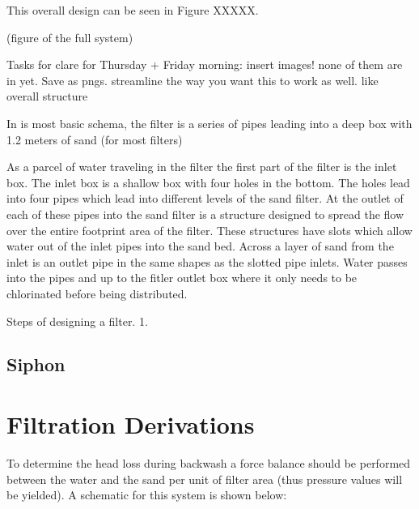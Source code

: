 \documentclass[letterpaper,10pt,english]{sphinxmanual}
\begin{document}
{This overall design can be seen in Figure XXXXX.

(figure of the full system)

Tasks for clare for Thursday + Friday morning: insert images! none of them are in yet. Save as pngs. streamline the way you want this to work as well. like overall structure

In is most basic schema, the filter is a series of pipes leading into a deep box with 1.2 meters of sand (for most filters)

As a parcel of water traveling in the filter the first part of the filter is the inlet box. The inlet box is a shallow box with four holes in the bottom. The holes lead into four pipes which lead into different levels of the sand filter. At the outlet of each of these pipes into the sand filter is a structure designed to spread the flow over the entire footprint area of the filter. These structures have slots which allow water out of the inlet pipes into the sand bed. Across a layer of sand from the inlet is an outlet pipe in the same shapes as the slotted pipe inlets. Water passes into the pipes and up to the fitler outlet box where it only needs to be chlorinated before being distributed.

Steps of designing a filter.
1.


\section{Siphon}
\label{\detokenize{Filtration/Filtration_Design:siphon}}\label{\detokenize{Filtration/Filtration_Design:id1}}

\chapter{Filtration Derivations}
\label{\detokenize{Filtration/Filtration_Derivations:filtration-derivations}}\label{\detokenize{Filtration/Filtration_Derivations:title-filtration-derivations}}\label{\detokenize{Filtration/Filtration_Derivations::doc}}\label{\detokenize{Filtration/Filtration_Derivations:derivation-backwash-headloss-force-balance}}
To determine the head loss during backwash a force balance should be performed between the water and the sand per unit of filter area (thus pressure values will be yielded). A schematic for this system is shown below:

\begin{figure}[htbp]
\centering

\noindent{}
\label{\detokenize{Filtration/Filtration_Derivations:figure-force-balance}}\end{figure}

}
\end{document}
